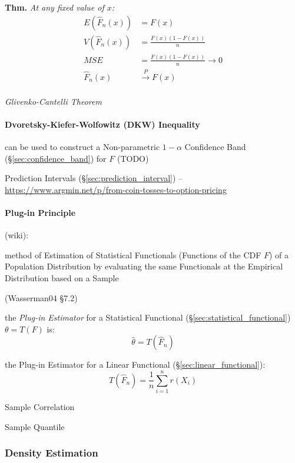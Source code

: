 \textbf{Thm.} \emph{
  At any fixed value of $x$:
  \begin{align*}
    E(\hat{F}_n(x)) & = F(x)                     \\
    V(\hat{F}_n(x)) & = \frac{F(x)(1 - F(x))}{n} \\
    MSE & = \frac{F(x)(1-F(x))}{n} \to 0 \\
    \hat{F}_n(x) & \xrightarrow{P} F(x)          \\
  \end{align*}
}

\emph{Glivenko-Cantelli Theorem}



\paragraph{Dvoretsky-Kiefer-Wolfowitz (DKW) Inequality}
\label{sec:dkw_inequality}\hfill

can be used to construct a Non-parametric $1-\alpha$ Confidence Band
(\S\ref{sec:confidence_band}) for $F$ (TODO)

\fist Prediction Intervals (\S\ref{sec:prediction_interval}) --
\url{https://www.argmin.net/p/from-coin-tosses-to-option-pricing}



\paragraph{Plug-in Principle}\label{sec:plugin_principle}\hfill

(wiki):

method of Estimation of Statistical Functionals (Functions of the CDF $F$) of a
Population Distribution by evaluating the same Functionals at the Empirical
Distribution based on a Sample

(Wasserman04 \S7.2)

the \emph{Plug-in Estimator} for a Statistical Functional
(\S\ref{sec:statistical_functional}) $\theta = T(F)$ is:
\[
  \hat{\theta} = T(\hat{F}_n)
\]

the Plug-in Estimator for a Linear Functional (\S\ref{sec:linear_functional}):
\[
  T(\hat{F}_n) = \frac{1}{n}\sum_{i=1}^n r(X_i)
\]

Sample Correlation

Sample Quantile



\subsubsection{Density Estimation}\label{sec:density_estimation}

